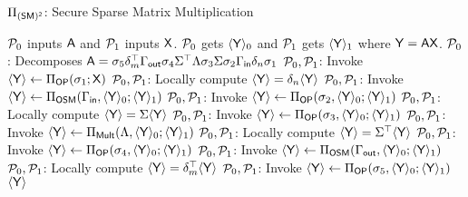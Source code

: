 
\begin{protocol}[!t]
\caption{$\Pi_{\mathsf{(SM)^2}}$: Secure Sparse Matrix Multiplication}\label{fig:osmm}
\begin{algorithmic}[1]
	\REQUIRE $\mathcal{P}_0$ inputs $\mathsf{A}$ and $\mathcal{P}_1$ inputs $\mathsf{X}$.
	\ENSURE $\mathcal{P}_0$ gets $\langle \mathsf{Y} \rangle_0$ and $\mathcal{P}_1$ gets $\langle \mathsf{Y} \rangle_1$ where $\mathsf{Y} = \mathsf{A}\mathsf{X}$.
	\STATE $\mathcal{P}_0$: Decomposes $\mathsf{A}= \sigma_5 \delta_m ^{\top} \Gamma_{\mathsf{out}} \sigma_4 \Sigma ^{\top} \Lambda \sigma_3 \Sigma \sigma_2 \Gamma_{\mathsf{in}} \delta_n \sigma_1$\label{osmm::decom}
	\STATE $\mathcal{P}_0, \mathcal{P}_1$: Invoke $\langle \mathsf{Y} \rangle \leftarrow {\Pi}_{\mathsf{OP}}(\sigma_1;\mathsf{X})$ \COMMENT{$\type == \raw$}\label{osmm::sigma1}
	\STATE $\mathcal{P}_0, \mathcal{P}_1$: Locally compute $\langle \mathsf{Y} \rangle = \delta_n \langle \mathsf{Y} \rangle$\label{osmm::deltan}
	\STATE $\mathcal{P}_0, \mathcal{P}_1$: Invoke $\langle \mathsf{Y} \rangle \leftarrow \Pi_{\mathsf{OSM}}(\Gamma_{\mathsf{in}}, \langle \mathsf{Y} \rangle_0; \langle \mathsf{Y} \rangle_1)$\label{osmm::gammain}
	\STATE $\mathcal{P}_0, \mathcal{P}_1$: Invoke $\langle \mathsf{Y} \rangle \leftarrow {\Pi}_{\mathsf{OP}}(\sigma_2, \langle \mathsf{Y} \rangle_0; \langle \mathsf{Y} \rangle_1)$\label{osmm::sigma2}
	\STATE $\mathcal{P}_0, \mathcal{P}_1$: Locally compute $\langle \mathsf{Y} \rangle = \Sigma \langle \mathsf{Y} \rangle$\label{osmm::Sigma}
	\STATE $\mathcal{P}_0, \mathcal{P}_1$: Invoke $\langle \mathsf{Y} \rangle \leftarrow {\Pi}_{\mathsf{OP}}(\sigma_3, \langle \mathsf{Y} \rangle_0; \langle \mathsf{Y} \rangle_1)$\label{osmm::sigma3}
	\STATE $\mathcal{P}_0, \mathcal{P}_1$: Invoke $\langle \mathsf{Y} \rangle \leftarrow \Pi_{\mathsf{Mult}}(\Lambda, \langle \mathsf{Y} \rangle_0; \langle \mathsf{Y} \rangle_1)$\label{osmm::lambda}
	\STATE $\mathcal{P}_0, \mathcal{P}_1$: Locally compute $\langle \mathsf{Y} \rangle = \Sigma^\top \langle \mathsf{Y} \rangle$\label{osmm::Sigmat}
	\STATE $\mathcal{P}_0, \mathcal{P}_1$: Invoke $\langle \mathsf{Y} \rangle \leftarrow {\Pi}_{\mathsf{OP}}(\sigma_4, \langle \mathsf{Y} \rangle_0; \langle \mathsf{Y} \rangle_1)$\label{osmm::sigma4}
	\STATE $\mathcal{P}_0, \mathcal{P}_1$: Invoke $\langle \mathsf{Y} \rangle \leftarrow \Pi_{\mathsf{OSM}}(\Gamma_{\mathsf{out}}, \langle \mathsf{Y} \rangle_0; \langle \mathsf{Y} \rangle_1)$\label{osmm::gammaout}
	\STATE $\mathcal{P}_0, \mathcal{P}_1$: Locally compute $\langle \mathsf{Y} \rangle = \delta_m^\top \langle \mathsf{Y} \rangle$\label{osmm::deltam}
	\STATE $\mathcal{P}_0, \mathcal{P}_1$: Invoke $\langle \mathsf{Y} \rangle \leftarrow {\Pi}_{\mathsf{OP}}(\sigma_5, \langle \mathsf{Y} \rangle_0; \langle \mathsf{Y} \rangle_1)$\label{osmm::sigma5}
	\RETURN $\langle \mathsf{Y} \rangle$
\end{algorithmic}
\end{protocol}

